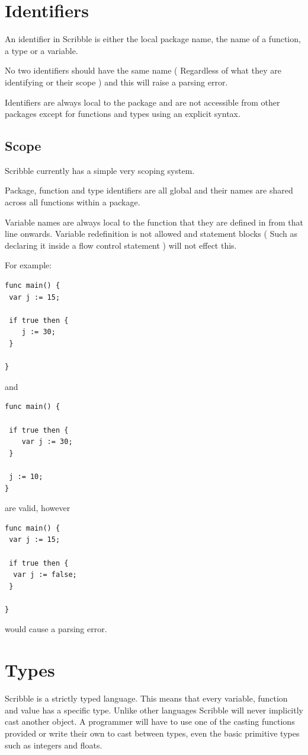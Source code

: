 \documentclass[]{final_report}
\begin{document}
\section{Identifiers}

An identifier in Scribble is either the local package name, the name of a function, a type or a variable.

No two identifiers should have the same name ( Regardless of what they are identifying or their scope ) and this will raise a parsing error.

Identifiers are always local to the package and are not accessible from other packages except for functions and types using an explicit syntax.

\subsection{Scope}

Scribble currently has a simple very scoping system.

Package, function and type identifiers are all global and their names are shared across all functions within a package.

Variable names are always local to the function that they are defined in from that line onwards. Variable redefinition is not allowed and statement blocks ( Such as declaring it inside a flow control statement ) will not effect this.

For example:
\begin{verbatim}
func main() {
 var j := 15;
 
 if true then {
 	j := 30;
 }

}
\end{verbatim}
and
\begin{verbatim}
func main() {
 
 if true then {
 	var j := 30;
 }
 
 j := 10;
}
\end{verbatim}
are valid, however
\begin{verbatim}
func main() {
 var j := 15;
 
 if true then { 
  var j := false; 
 }

}
\end{verbatim}
would cause a parsing error.

\section{Types}

Scribble is a strictly typed language. This means that every variable, function and value has a specific type. Unlike other languages Scribble will never implicitly cast another object. A programmer will have to use one of the casting functions provided or write their own to cast between types, even the basic primitive types such as integers and floats.
\end{document}
